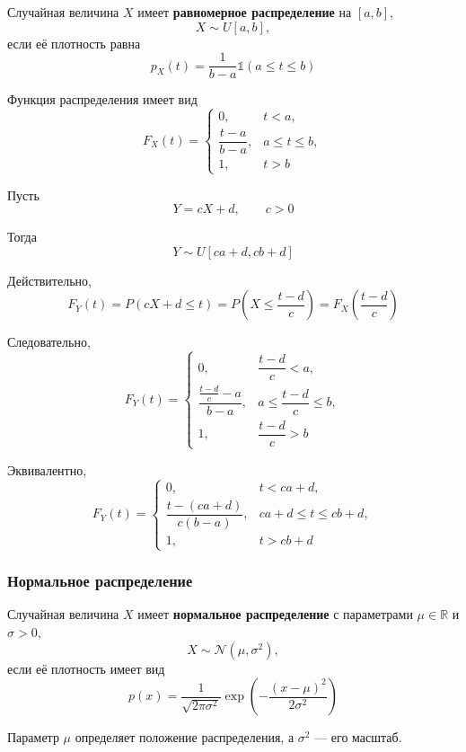 \documentclass[12pt,a4paper]{article}
\begin{document}
\begin{definition}

Случайная величина $X$ имеет \textbf{равномерное распределение} на $[a,b]$,
\[
X\sim U[a,b],
\]
если её плотность равна
\[
p_X(t)
=
\frac{1}{b-a}\mathds{1}(a\leq t\leq b)
\]

\end{definition}

Функция распределения имеет вид
\[
F_X(t)
=
\begin{cases}
0, & t<a,\\[1mm]
\dfrac{t-a}{b-a}, & a\leq t\leq b,\\[2mm]
1, & t>b
\end{cases}
\]

Пусть
\[
Y=cX+d,
\qquad
c>0
\]

Тогда
\[
Y\sim U[ca+d,cb+d]
\]

Действительно,
\[
F_Y(t)
=
P(cX+d\leq t)
=
P\left(X\leq\frac{t-d}{c}\right)
=
F_X\left(\frac{t-d}{c}\right)
\]

Следовательно,
\[
F_Y(t)
=
\begin{cases}
0, & \dfrac{t-d}{c}<a,\\[2mm]
\dfrac{\frac{t-d}{c}-a}{b-a},
& a\leq\dfrac{t-d}{c}\leq b,\\[3mm]
1, & \dfrac{t-d}{c}>b
\end{cases}
\]

Эквивалентно,
\[
F_Y(t)
=
\begin{cases}
0, & t<ca+d,\\[1mm]
\dfrac{t-(ca+d)}{c(b-a)},
& ca+d\leq t\leq cb+d,\\[3mm]
1, & t>cb+d
\end{cases}
\]

\subsubsection{Нормальное распределение}

\begin{definition}

Случайная величина $X$ имеет \textbf{нормальное распределение} с параметрами $\mu\in\mathbb{R}$ и $\sigma>0$,
\[
X\sim\mathcal{N}(\mu,\sigma^2),
\]
если её плотность имеет вид
\[
p(x)
=
\frac{1}{\sqrt{2\pi\sigma^2}}
\exp\left(
-\frac{(x-\mu)^2}{2\sigma^2}
\right)
\]

Параметр $\mu$ определяет положение распределения, а $\sigma^2$ --- его масштаб.

\end{definition}
\end{document}
